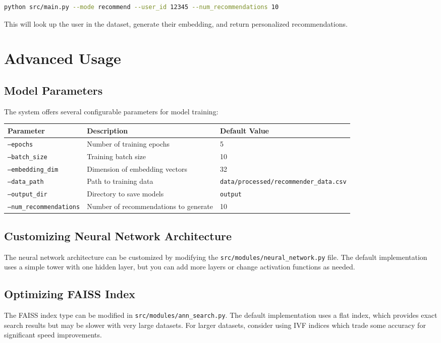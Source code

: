 \documentclass[12pt, a4paper, oneside]{book}
\begin{document}
\begin{lstlisting}[language=bash]
python src/main.py --mode recommend --user_id 12345 --num_recommendations 10
\end{lstlisting}

This will look up the user in the dataset, generate their embedding, and return personalized recommendations.

\chapter{Advanced Usage}

\section{Model Parameters}
The system offers several configurable parameters for model training:

\begin{tabular}{p{4cm}p{5cm}p{4cm}}
\toprule
Parameter & Description & Default Value \\
\midrule
\texttt{--epochs} & Number of training epochs & 5 \\
\texttt{--batch\_size} & Training batch size & 10 \\
\texttt{--embedding\_dim} & Dimension of embedding vectors & 32 \\
\texttt{--data\_path} & Path to training data & \texttt{data/processed/recommender\_data.csv} \\
\texttt{--output\_dir} & Directory to save models & \texttt{output} \\
\texttt{--num\_recommendations} & Number of recommendations to generate & 10 \\
\bottomrule
\end{tabular}

\section{Customizing Neural Network Architecture}
The neural network architecture can be customized by modifying the \texttt{src/modules/neural\_network.py} file. The default implementation uses a simple tower with one hidden layer, but you can add more layers or change activation functions as needed.

\section{Optimizing FAISS Index}
The FAISS index type can be modified in \texttt{src/modules/ann\_search.py}. The default implementation uses a flat index, which provides exact search results but may be slower with very large datasets. For larger datasets, consider using IVF indices which trade some accuracy for significant speed improvements.
\end{document}
